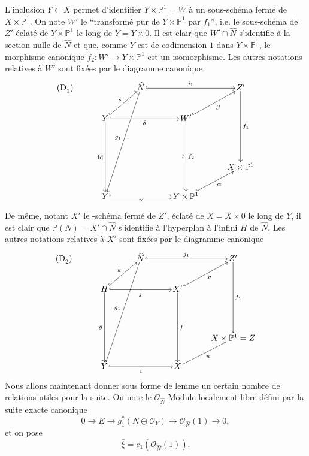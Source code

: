 L'inclusion $Y\subset X$ permet d'identifier $Y\times\mathbb{P}^1=W$ à un sous-schéma fermé de $X\times\mathbb{P}^1$. On note $W'$ le ``transformé pur de $Y\times\mathbb{P}^1$ par $f_1$'', i.e. le sous-schéma de $Z'$ éclaté de $Y\times\mathbb{P}^1$ le long de $Y=Y\times0$. Il est clair que $W'\cap\widehat N$ s'identifie à la section nulle de $\widehat N$ et que, comme $Y$ est de codimension $1$ dans $Y\times\mathbb{P}^1$, le morphisme canonique $f_2:W'\to Y\times\mathbb{P}^1$ est un isomorphisme. Les autres notations relatives à $W'$ sont fixées par le diagramme canonique
\[
\begin{tikzcd}[column sep=3.2em,row sep=2.4em,cells={nodes={inner sep=1pt}}]
\text{(D}_1\text{)}\arrow[from=1-3,to=5-2,"g_1"']
& & \widehat N \arrow[rr,hook,"j_1"] & & Z' \arrow[ddd,"f_1"] \\
& Y \arrow[ur,hook,"s"] \arrow[rr,hook,"\delta"'] \arrow[ddd,"\mathrm{id}"'] & &
W' \arrow[ur,hook,"\beta"'] \arrow[ddd,"\wr"',"f_2"] & \\
& & & & \\
& & & & X\times\mathbb{P}^1 \\
& Y \arrow[rr,hook,"\gamma"'] & & Y\times\mathbb{P}^1 \arrow[ur,hook,"\alpha"'] &
\end{tikzcd}
\]
De même, notant $X'$ le -schéma fermé de $Z'$, éclaté de $X=X\times0$ le long de $Y$, il est
clair que $\mathbb{P}(N)=X'\cap\widehat N$ s'identifie à l'hyperplan à l'infini $H$ de $\widehat N$. Les autres notations relatives à $X'$ sont fixées par le diagramme canonique
\[
\begin{tikzcd}[column sep=3.2em,row sep=2.4em,cells={nodes={inner sep=1pt}}]
\text{(D}_2\text{)}\arrow[from=1-3,to=5-2,"g_1"']
& & \widehat N \arrow[rr,hook,"j_1"] & & Z' \arrow[ddd,"f_1"] \\
& H \arrow[ur,hook,"k"] \arrow[rr,hook,"j"'] \arrow[ddd,"g"'] & &
X' \arrow[ur,hook,"v"'] \arrow[ddd,"f"] & \\
& & & & \\
& & & & X\times\mathbb{P}^1=Z \\
& Y \arrow[rr,hook,"i"'] & & X \arrow[ur,"u"'] &
\end{tikzcd}
\]
Nous allons maintenant donner sous forme de lemme un certain nombre de relations utiles pour la suite. On note le $\mathcal{O}_{\widehat N}$-Module localement libre défini par la suite exacte canonique
\[
0\to E\to g_1^*(N\oplus\mathcal{O}_Y)\to\mathcal{O}_{\widehat N}(1)\to0,
\tag{9.3.0}
\]
et on pose
\[
\bar\xi=c_1(\mathcal{O}_{\widehat N}(1)).
\tag{9.3.1}
\]

